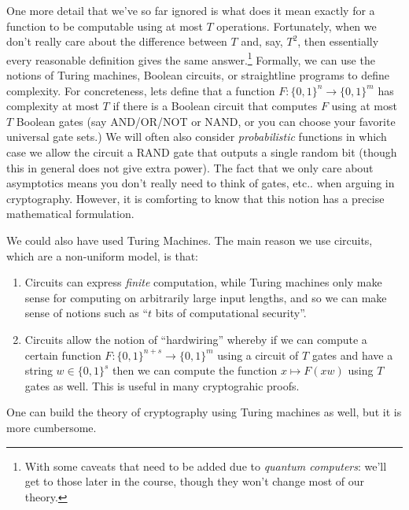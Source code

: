 One more detail that we've so far ignored is what does it mean exactly
for a function to be computable using at most \(T\) operations.
Fortunately, when we don't really care about the difference between
\(T\) and, say, \(T^2\), then essentially every reasonable definition
gives the same answer.\footnote{With some caveats that need to be added
  due to \emph{quantum computers}: we'll get to those later in the
  course, though they won't change most of our theory.} Formally, we can
use the notions of Turing machines, Boolean circuits, or straightline
programs to define complexity. For concreteness, lets define that a
function \(F:{\{0,1\}}^n\rightarrow{\{0,1\}}^m\) has complexity at most
\(T\) if there is a Boolean circuit that computes \(F\) using at most
\(T\) Boolean gates (say AND/OR/NOT or NAND, or you can choose your
favorite universal gate sets.) We will often also consider
\emph{probabilistic} functions in which case we allow the circuit a RAND
gate that outputs a single random bit (though this in general does not
give extra power). The fact that we only care about asymptotics means
you don't really need to think of gates, etc.. when arguing in
cryptography. However, it is comforting to know that this notion has a
precise mathematical formulation.

We could also have used Turing Machines. The main reason we use
circuits, which are a non-uniform model, is that:

\begin{enumerate}
\def\labelenumi{\arabic{enumi}.}
\item
  Circuits can express \emph{finite} computation, while Turing machines
  only make sense for computing on arbitrarily large input lengths, and
  so we can make sense of notions such as ``\(t\) bits of computational
  security''.
\item
  Circuits allow the notion of ``hardwiring'' whereby if we can compute
  a certain function \(F:\{0,1\}^{n+s} \rightarrow \{0,1\}^m\) using a
  circuit of \(T\) gates and have a string \(w \in \{0,1\}^s\) then we
  can compute the function \(x \mapsto F(xw)\) using \(T\) gates as
  well. This is useful in many cryptograhic proofs.
\end{enumerate}

One can build the theory of cryptography using Turing machines as well,
but it is more cumbersome.

\hypertarget{computebeyondfunctions}{}

